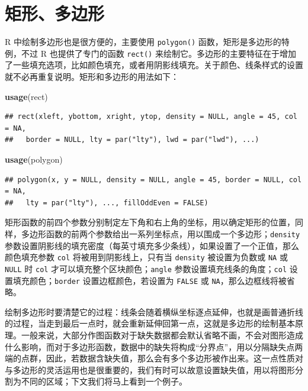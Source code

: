 \documentclass[
  b5paper,
  UTF8,twoside]{book}
\newenvironment{Shaded}{\begin{snugshade}}{\end{snugshade}}
\newcommand{\FunctionTok}[1]{\textcolor[rgb]{0.13,0.29,0.53}{\textbf{#1}}}
\newcommand{\NormalTok}[1]{#1}
\begin{document}
\section{矩形、多边形}\label{sec:polygon}

R 中绘制多边形也是很方便的，主要使用 \texttt{polygon()} 函数，矩形是多边形的特例，不过 R 也提供了专门的函数 \texttt{rect()} 来绘制它。多边形的主要特征在于增加了一些填充选项，比如颜色填充，或者用阴影线填充。关于颜色、线条样式的设置就不必再重复说明。矩形和多边形的用法如下：

\begin{Shaded}
\begin{Highlighting}[]
\FunctionTok{usage}\NormalTok{(rect)}
\end{Highlighting}
\end{Shaded}

\begin{verbatim}
## rect(xleft, ybottom, xright, ytop, density = NULL, angle = 45, col = NA,
##   border = NULL, lty = par("lty"), lwd = par("lwd"), ...)
\end{verbatim}

\begin{Shaded}
\begin{Highlighting}[]
\FunctionTok{usage}\NormalTok{(polygon)}
\end{Highlighting}
\end{Shaded}

\begin{verbatim}
## polygon(x, y = NULL, density = NULL, angle = 45, border = NULL, col = NA,
##   lty = par("lty"), ..., fillOddEven = FALSE)
\end{verbatim}

矩形函数的前四个参数分别制定左下角和右上角的坐标，用以确定矩形的位置，同样，多边形函数的前两个参数给出一系列坐标点，用以围成一个多边形；\texttt{density} 参数设置阴影线的填充密度（每英寸填充多少条线），如果设置了一个正值，那么颜色填充参数 \texttt{col} 将被用到阴影线上，只有当 \texttt{density} 被设置为负数或 \texttt{NA} 或 \texttt{NULL} 时 \texttt{col} 才可以填充整个区块颜色；\texttt{angle} 参数设置填充线条的角度；\texttt{col} 设置填充颜色；\texttt{border} 设置边框颜色，若设置为 \texttt{FALSE} 或 \texttt{NA}，那么边框线将被省略。

绘制多边形时要清楚它的过程：线条会随着横纵坐标逐点延伸，也就是画普通折线的过程，当走到最后一点时，就会重新延伸回第一点，这就是多边形的绘制基本原理。一般来说，大部分作图函数对于缺失数据都会默认省略不画，不会对图形造成什么影响，而对于多边形函数，数据中的缺失将构成``分界点''，用以分隔缺失点两端的点群，因此，若数据含缺失值，那么会有多个多边形被作出来。这一点性质对与多边形的灵活运用也是很重要的，我们有时可以故意设置缺失值，用以将图形分割为不同的区域；下文我们将马上看到一个例子。
\end{document}
